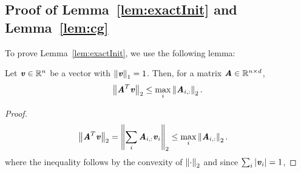 \subsection{Proof of Lemma~\ref{lem:exactInit} and Lemma~\ref{lem:cg}}
\label{subsec:initialization_proofs}

To prove Lemma~\ref{lem:exactInit}, we use the following lemma:
\begin{lemma}\label{lem:subordinatenorm}
	Let $\vv \in \R^n$ be a vector with $\norm{\vv}_1 = 1$.
	Then, for a matrix $\AA \in \R^{n \times d}$,
	\begin{align*}
	\norme{\AA^T \vv} \leq \max_i \norme{\AA_{i,:}}.
	\end{align*}
\end{lemma}



\begin{proof}
	\begin{align*}
	\norme{\AA^T \vv} & = \norme{\sum_i \AA_{i,:} \vv_i} \leq \max_i \norme{\AA_{i,:}}.
	\end{align*}
	where the inequality follows by the convexity of $\norm{\cdot}_2$ and since $\sum_i \abs{\vv_i} = 1$,
\end{proof}





